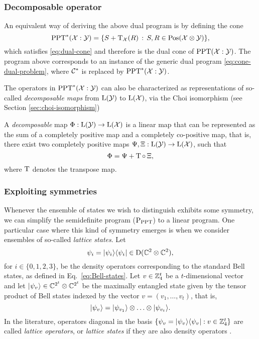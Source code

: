 \subsubsection{Decomposable operator}
An equivalent way of deriving the above dual program is by defining the cone 
\begin{equation}
  \mathrm{PPT}^{\ast}(\mathcal{X}:\mathcal{Y}) = \{ S + \operatorname{T}_{\mathcal{X}}(R) \,:\, S, R \in \mathrm{Pos}(\mathcal{X}\otimes\mathcal{Y}) \},
\end{equation}
which satisfies \eqref{eq:dual-cone} and therefore is the dual cone of 
$\mathrm{PPT}(\mathcal{X}:\mathcal{Y})$.
The program above corresponds to an instance of 
the generic dual program \eqref{eq:cone-dual-problem}, where $\mathcal{C}^{\ast}$ is 
replaced by $\mathrm{PPT}^{\ast}(\mathcal{X}:\mathcal{Y})$.

The operators in $\mathrm{PPT}^{\ast}(\mathcal{X}:\mathcal{Y})$ can also be characterized as 
representations of so-called \emph{decomposable maps} from 
$\mathrm{L}(\mathcal{Y})$ to $\mathrm{L}(\mathcal{X})$, via the Choi isomorphism 
(see Section \ref{sec:choi-isomorphism})
\begin{definition}
A \emph{decomposable} map $\Phi:\mathrm{L}(\mathcal{Y})\rightarrow\mathrm{L}(\mathcal{X})$ is a linear map that can 
be represented as the sum of a completely positive map and a completely 
co-positive map, that is, there exist two completely positive maps 
$\Psi,\Xi:\mathrm{L}(\mathcal{Y})\rightarrow\mathrm{L}(\mathcal{X})$, such that
\begin{equation}
  \Phi = \Psi + \operatorname{T} {\circ}\, \Xi,
\end{equation}
where $\operatorname{T}$ denotes the transpose map.
\end{definition}

\subsubsection{Exploiting symmetries}

Whenever the ensemble of states we wish to distinguish exhibits some symmetry,
we can simplify the semidefinite program ($\textup{P}_{\mathrm{PPT}}$) to a linear program.
One particular case where this kind of symmetry emerges is when 
we consider ensembles of so-called \emph{lattice states}. Let
\[
  \psi_{i} = \lvert\mspace{0.5mu} \psi_{i} \mspace{0.5mu} \rangle\langle\mspace{0.5mu} \psi_{i} \mspace{0.5mu} \rvert \in \mathrm{D}(\mathbb{C}^{2}\otimes\mathbb{C}^{2}),
\]
for $i\in \{0,1,2,3\}$, be the density operators corresponding to the standard Bell 
states, as defined in Eq.~\eqref{eq:Bell-states}.
Let $v \in \mathbb{Z}_{4}^{t} $ be a $t$-dimensional vector and let 
$\lvert\mspace{0.5mu} \psi_{v} \mspace{0.5mu} \rangle \in \mathbb{C}^{2^{t}}\otimes\mathbb{C}^{2^{t}}$ 
be the maximally entangled state given by the tensor product of Bell states indexed by the vector 
$v = (v_{1}, \ldots, v_{t})$, that is,
$$
\lvert\mspace{0.5mu} \psi_{v} \mspace{0.5mu} \rangle = \lvert\mspace{0.5mu} \psi_{v_{1}} \mspace{0.5mu} \rangle\otimes\ldots\otimes\lvert\mspace{0.5mu} \psi_{v_{t}} \mspace{0.5mu} \rangle.
$$
In the literature, operators diagonal in the basis 
$\{\psi_{v} = \lvert\mspace{0.5mu} \psi_{v} \mspace{0.5mu} \rangle\langle\mspace{0.5mu} \psi_{v} \mspace{0.5mu} \rvert : v \in \mathbb{Z}_{4}^{t}\}$
are called \emph{lattice operators}, or \emph{lattice states} if they are also 
density operators \cite{Piani06}.

